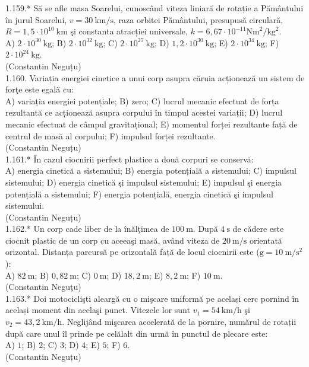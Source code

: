 1.159.* Să se afle masa Soarelui, cunoscând viteza liniară de rotație a Pământului în jurul Soarelui, $v=30 \mathrm{~km} / \mathrm{s}$, raza orbitei Pământului, presupusă circulară, $R=1,5 \cdot 10^{10} \mathrm{~km}$ şi constanta atracției universale, $k=6,67 \cdot 10^{-11} \mathrm{Nm}^{2} / \mathrm{kg}^{2}$.\\ A) $2 \cdot 10^{30} \mathrm{~kg}$; B) $2 \cdot 10^{32} \mathrm{~kg}$; C) $2 \cdot 10^{27} \mathrm{~kg}$; D) $1,2 \cdot 10^{30} \mathrm{~kg}$; E) $2 \cdot 10^{34} \mathrm{~kg}$; F) $2 \cdot 10^{24} \mathrm{~kg}$.\\ (Constantin Neguțu)\\

1.160. Variația energiei cinetice a unui corp asupra căruia acționează un sistem de forţe este egalã cu:\\ A) variația energiei potențiale; B) zero; C) lucrul mecanic efectuat de forța rezultantă ce acționează asupra corpului în timpul acestei variații; D) lucrul mecanic efectuat de câmpul gravitațional; E) momentul forței rezultante față de centrul de masă al corpului; F) impulsul forței rezultante.\\ (Constantin Neguțu)\\

1.161.* În cazul ciocnirii perfect plastice a două corpuri se conservă:\\ A) energia cinetică a sistemului; B) energia potențială a sistemului; C) impulsul sistemului; D) energia cinetică şi impulsul sistemului; E) impulsul şi energia potențială a sistemului; F) energia potențială, energia cinetică şi impulsul sistemului.\\ (Constantin Neguțu)\\

1.162.* Un corp cade liber de la înălţimea de $100 \mathrm{~m}$. După $4 \mathrm{~s}$ de cădere este ciocnit plastic de un corp cu aceeaşi masă, având viteza de $20 \mathrm{~m} / \mathrm{s}$ orientată orizontal. Distanța parcursă pe orizontală față de locul ciocnirii este ($\mathrm{g}=10 \mathrm{~m} / \mathrm{s}^{2}$):\\ A) $82 \mathrm{~m}$; B) $0,82 \mathrm{~m}$; C) $0 \mathrm{~m}$; D) $18,2 \mathrm{~m}$; E) $8,2 \mathrm{~m}$; F) $10 \mathrm{~m}$.\\ (Constantin Neguţu)\\

1.163.* Doi motociclişti aleargă cu o mişcare uniformă pe același cerc pornind în același moment din acelaşi punct. Vitezele lor sunt $v_{1}=54 \mathrm{~km} / \mathrm{h}$ şi $v_{2}=43,2 \mathrm{~km} / \mathrm{h}$. Neglijând mişcarea accelerată de la pornire, numărul de rotații după care unul îl prinde pe celălalt din urmă în punctul de plecare este:\\ A) $1$; B) $2$; C) $3$; D) $4$; E) $5$; F) $6$.\\ (Constantin Neguțu)\\

